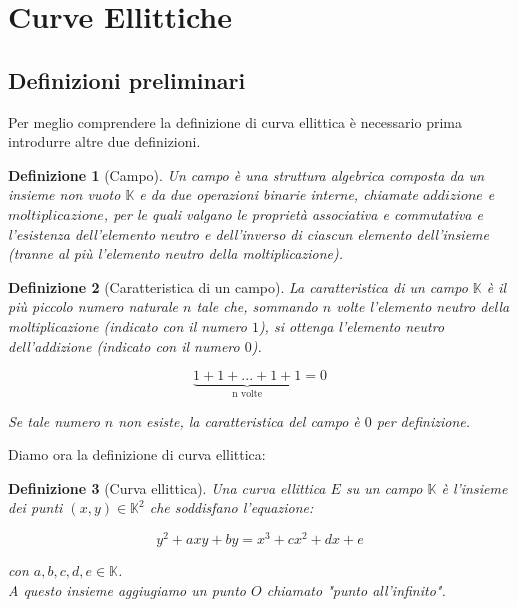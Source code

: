 \documentclass{article}
\begin{document}
	\section{Curve Ellittiche}
	
	\subsection{Definizioni preliminari}
	
	Per meglio comprendere la definizione di curva ellittica è necessario prima introdurre altre due definizioni.
	
	\newtheorem{defn}{Definizione}
	\newtheorem{teo}{Teorema}
	\begin{defn}[Campo]
		Un campo è una struttura algebrica composta da un insieme non vuoto $\mathbb{K}$ e da due operazioni binarie interne, chiamate $addizione$ e $moltiplicazione$, per le quali valgano le proprietà associativa e commutativa e l'esistenza dell'elemento neutro e dell'inverso di ciascun elemento dell'insieme (tranne al più l'elemento neutro della moltiplicazione).
	\end{defn}
	
	\begin{defn}[Caratteristica di un campo]
		La caratteristica di un campo $\mathbb{K}$ è il più piccolo numero naturale $n$ tale che, sommando $n$ volte l'elemento neutro della moltiplicazione (indicato con il numero $1$), si ottenga l'elemento neutro dell'addizione (indicato con il numero $0$).
		
		\begin{equation}
		\underbrace{1+1+...+1+1}_\text{n volte} = 0
		\end{equation}
		
		Se tale numero $n$ non esiste, la caratteristica del campo è $0$ per definizione.\\
	\end{defn}
	
	Diamo ora la definizione di curva ellittica:
	
	\begin{defn}[Curva ellittica]
		Una curva ellittica $E$ su un campo $\mathbb{K}$ è l'insieme dei punti $(x,y) \in \mathbb{K}^{2}$ che soddisfano l'equazione:
		
		\begin{equation}
		y^{2} + axy + by = x^{3} + cx^{2} + dx + e
		\end{equation}
		
		con $a, b, c, d, e \in \mathbb{K}$.\\
		A questo insieme aggiugiamo un punto $O$ chiamato "punto all'infinito".\\
	\end{defn}
	
\end{document}
